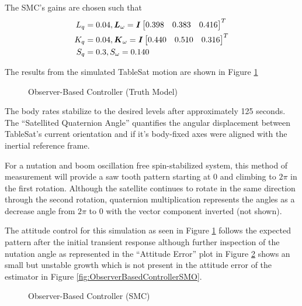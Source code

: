 The SMC's gains are chosen such that
\begin{equation}
  \begin{aligned}
    L_q &= 0.04, \boldsymbol{L}_{\omega} = \boldsymbol{I} \begin{bmatrix} 0.398 & 0.383 & 0.416 \end{bmatrix}^T \\
    K_q &= 0.04, \boldsymbol{K}_{\omega} = \boldsymbol{I} \begin{bmatrix} 0.440 & 0.510 & 0.316 \end{bmatrix}^T \\
    S_q &= 0.3, S_{\omega} = 0.140
  \end{aligned}
\end{equation}


The results from the simulated TableSat motion are shown in Figure \ref{fig:ObserverBasedControllerTruth}
\begin{figure}[H]
  \centerline{}
  \caption{Observer-Based Controller (Truth Model)}
  \label{fig:ObserverBasedControllerTruth}
\end{figure}

The body rates stabilize to the desired levels after approximately 125 seconds.  The ``Satellited Quaternion Angle'' quantifies the angular displacement between TableSat's current orientation and if it's body-fixed axes were aligned with the inertial reference frame.

For a nutation and boom oscillation free spin-stabilized system, this method of measurement will provide a saw tooth pattern starting at 0 and climbing to $2\pi$ in the first rotation.  Although the satellite continues to rotate in the same direction through the second rotation, quaternion multiplication represents the angles as a decrease angle from $2\pi$ to 0 with the vector component inverted (not shown).

The attitude control for this simulation as seen in Figure \ref{fig:ObserverBasedControllerTruth} follows the expected pattern after the initial transient response although further inspection of the nutation angle as represented in the ``Attitude Error'' plot in Figure \ref{fig:ObserverBasedControllerSMC} shows an small but unstable growth which is not present in the attitude error of the estimator in Figure \ref{fig:ObserverBasedControllerSMO}.
\begin{figure}[H]
  \centerline{}
  \caption{Observer-Based Controller (SMC)}
  \label{fig:ObserverBasedControllerSMC}
\end{figure}

